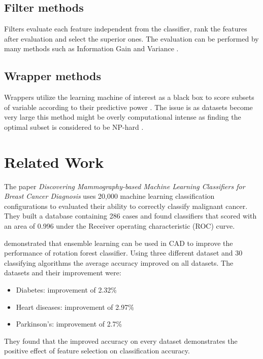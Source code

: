 \documentclass{kththesis}
\begin{document}
\subsection{Filter methods} %

Filters evaluate each feature independent from the classifier, rank the features after evaluation and select the superior ones. The evaluation can be performed by many methods such as Information Gain and Variance \parencite{guyon2003}.

\subsection{Wrapper methods} %

Wrappers utilize the learning machine of interest as a black box to score subsets of variable according to their predictive power \parencite{guyon2003}. The issue is as datasets become very large this method might be overly computational intense as finding the optimal subset is considered to be NP-hard \parencite{amaldi1998}.

\section{Related Work}

The paper \textit{Discovering Mammography-based Machine Learning Classifiers for Breast Cancer Diagnosis} \parencite{ramos2012} uses 20,000 machine learning classification configurations to evaluated their ability to correctly classify malignant cancer. They built a database containing 286 cases and found classifiers that scored with an area of 0.996 under the Receiver operating characteristic (ROC) curve.

\textcite{akin2011} demonstrated that ensemble learning can be used in CAD to improve the performance of rotation forest classifier. Using three different dataset and 30 classifying algorithms the average accuracy improved on all datasets. The datasets and their improvement were:

\begin{itemize}
  \item Diabetes: improvement of 2.32\%
  \item Heart diseases: improvement of 2.97\%
  \item Parkinson's: improvement of 2.7\%
\end{itemize}

They found that the improved accuracy on every dataset demonstrates the positive effect of feature selection on classification accuracy.\\
\end{document}
